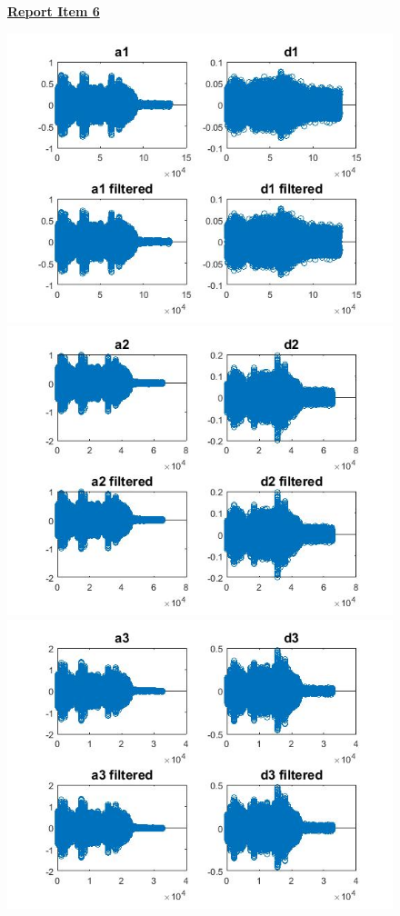 \documentclass{article}
\begin{document}
\begin{figure}[H]
\color{red}
\underline{\textbf{Report Item 6}}
\color{black}

\includegraphics[scale=.5]{a1d1}
\includegraphics[scale=.5]{a2d2}
\includegraphics[scale=.5]{a3d3}

\end{figure}
\end{document}
